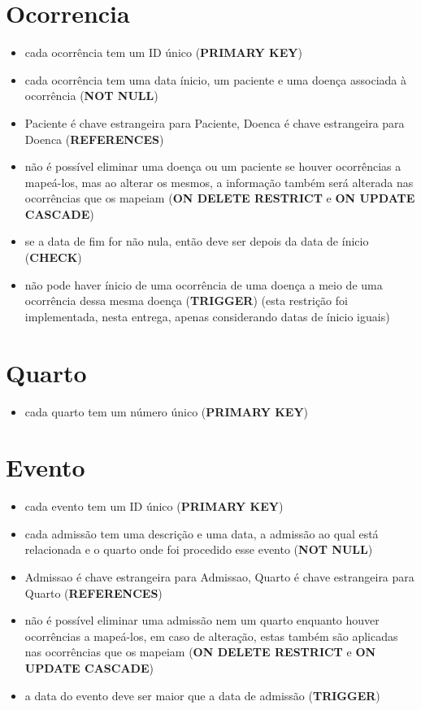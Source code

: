 \documentclass[article, a4paper, 12pt, oneside]{memoir}
\begin{document}
\section*{Ocorrencia}
\begin{itemize}
	\item cada ocorrência tem um ID único (\textbf{PRIMARY KEY})
	\item cada ocorrência tem uma data ínicio, um paciente e uma doença associada à ocorrência (\textbf{NOT NULL})
	\item Paciente é chave estrangeira para Paciente, Doenca é chave estrangeira para Doenca (\textbf{REFERENCES})
	\item não é possível eliminar uma doença ou um paciente se houver ocorrências a mapeá-los, mas ao alterar os mesmos, a informação também será alterada nas ocorrências que os mapeiam (\textbf{ON DELETE RESTRICT} e \textbf{ON UPDATE CASCADE})
	\item se a data de fim for não nula, então deve ser depois da data de ínicio (\textbf{CHECK})
	\item não pode haver ínicio de uma ocorrência de uma doença a meio de uma ocorrência dessa mesma doença (\textbf{TRIGGER}) (esta restrição foi implementada, nesta entrega, apenas considerando datas de ínicio iguais)
\end{itemize}

\section*{Quarto}
\begin{itemize}
	\item cada quarto tem um número único (\textbf{PRIMARY KEY})
\end{itemize}

\section*{Evento}
\begin{itemize}
	\item cada evento tem um ID único (\textbf{PRIMARY KEY})
	\item cada admissão tem uma descrição e uma data, a admissão ao qual está relacionada e o quarto onde foi procedido esse evento (\textbf{NOT NULL})
	\item Admissao é chave estrangeira para Admissao, Quarto é chave estrangeira para Quarto (\textbf{REFERENCES})
	\item não é possível eliminar uma admissão nem um quarto enquanto houver ocorrências a mapeá-los, em caso de alteração, estas também são aplicadas nas ocorrências que os mapeiam (\textbf{ON DELETE RESTRICT} e \textbf{ON UPDATE CASCADE})
	\item a data do evento deve ser maior que a data de admissão (\textbf{TRIGGER})
\end{itemize}
\end{document}
